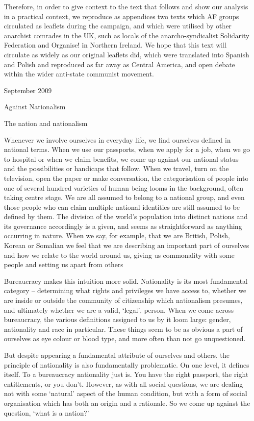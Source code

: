 Therefore, in order to give context to the text that follows and show our analysis in a practical context, we reproduce as appendices two texts which AF groups circulated as leaflets during the campaign, and which were utilised by other anarchist comrades in the UK, such as locals of the anarcho-syndicalist Solidarity Federation and Organise! in Northern Ireland. We hope that this text will circulate as widely as our original leaflets did, which were translated into Spanish and Polish and reproduced as far away as Central America, and open debate within the wider anti-state communist movement.

September 2009

Against Nationalism

The nation and nationalism

Whenever we involve ourselves in everyday life, we find ourselves defined in national terms. When we use our passports, when we apply for a job, when we go to hospital or when we claim benefits, we come up against our national status and the possibilities or handicaps that follow. When we travel, turn on the television, open the paper or make conversation, the categorisation of people into one of several hundred varieties of human being looms in the background, often taking centre stage. We are all assumed to belong to a national group, and even those people who can claim multiple national identities are still assumed to be defined by them. The division of the world’s population into distinct nations and its governance accordingly is a given, and seems as straightforward as anything occurring in nature. When we say, for example, that we are British, Polish, Korean or Somalian we feel that we are describing an important part of ourselves and how we relate to the world around us, giving us commonality with some people and setting us apart from others

Bureaucracy makes this intuition more solid. Nationality is its most fundamental category – determining what rights and privileges we have access to, whether we are inside or outside the community of citizenship which nationalism presumes, and ultimately whether we are a valid, ‘legal’, person. When we come across bureaucracy, the various definitions assigned to us by it loom large: gender, nationality and race in particular. These things seem to be as obvious a part of ourselves as eye colour or blood type, and more often than not go unquestioned.

But despite appearing a fundamental attribute of ourselves and others, the principle of nationality is also fundamentally problematic. On one level, it defines itself. To a bureaucracy nationality just is. You have the right passport, the right entitlements, or you don’t. However, as with all social questions, we are dealing not with some ‘natural’ aspect of the human condition, but with a form of social organisation which has both an origin and a rationale. So we come up against the question, ‘what is a nation?’

